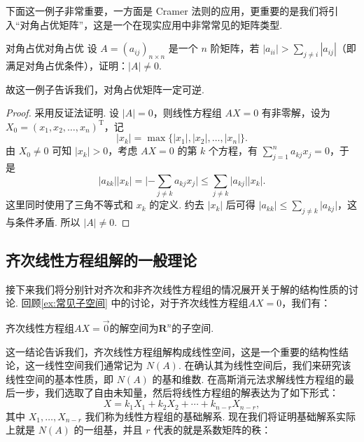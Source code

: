 下面这一例子非常重要，一方面是 Cramer 法则的应用，更重要的是我们将引入``对角占优矩阵''，这是一个在现实应用中非常常见的矩阵类型.
\begin{example}{对角占优}{对角占优}
    设 $A = (a_{ij})_{n \times n}$ 是一个 $n$ 阶矩阵，若 $|a_{ii}| > \displaystyle\sum_{j \neq i}|a_{ij}|$（即满足对角占优条件），证明：$|A|\neq 0$.
\end{example}
故这一例子告诉我们，对角占优矩阵一定可逆.
\begin{proof}
    采用反证法证明. 设 $\lvert A \rvert = 0$，则线性方程组 $AX = 0$ 有非零解，设为 $X_0 = (x_1, x_2, \ldots, x_n)^{\mathrm{T}}$，记
    \[\lvert x_k \rvert = \max \{\lvert x_1 \rvert, \lvert x_2 \rvert, \ldots, \lvert x_n \rvert\}.\]
    由 $X_0 \neq 0$ 可知 $\lvert x_k \rvert > 0$，考虑 $AX = 0$ 的第 $k$ 个方程，有 $\displaystyle\sum_{j=1}^n a_{kj}x_j = 0$，于是
    \[\lvert a_{kk} \rvert \lvert x_k \rvert = \lvert -\displaystyle\sum_{j \neq k}a_{kj}x_j \rvert \leqslant \sum_{j \neq k}\lvert a_{kj} \rvert \lvert x_k \rvert.\]
    这里同时使用了三角不等式和 $x_k$ 的定义. 约去 $\lvert x_k \rvert$ 后可得 $\lvert a_{kk} \rvert \leqslant \displaystyle\sum_{j \neq k} \lvert a_{kj} \rvert$，这与条件矛盾. 所以 $\lvert A \rvert \neq 0$.
\end{proof}

\subsection{齐次线性方程组解的一般理论}

接下来我们将分别针对齐次和非齐次线性方程组的情况展开关于解的结构性质的讨论. 回顾\autoref{ex:常见子空间} 中的讨论，对于齐次线性方程组$AX=0$，我们有：
\begin{theorem}{}{}
    齐次线性方程组$AX=\vec{0}$的解空间为$\mathbf{R}^n$的子空间.
\end{theorem}
这一结论告诉我们，齐次线性方程组解构成线性空间，这是一个重要的结构性结论，这一线性空间我们通常记为 $N(A)$. 在确认其为线性空间后，我们来研究该线性空间的基本性质，即 $N(A)$ 的基和维数. 在高斯消元法求解线性方程组的最后一步，我们选取了自由未知量，然后将线性方程组的解表达为了如下形式：
\[X = k_1X_1 + k_2X_2 + \cdots + k_{n-r}X_{n-r},\]
其中 $X_1,\ldots,X_{n-r}$ 我们称为线性方程组的基础解系. 现在我们将证明基础解系实际上就是 $N(A)$ 的一组基，并且 $r$ 代表的就是系数矩阵的秩：

